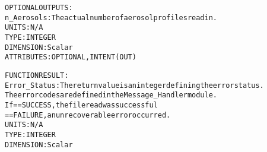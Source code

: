 \begin{alltt}
  OPTIONAL OUTPUTS:
        n_Aerosols:     The actual number of aerosol profiles read in.
                        UNITS:      N/A
                        TYPE:       INTEGER
                        DIMENSION:  Scalar
                        ATTRIBUTES: OPTIONAL, INTENT(OUT)
 
  FUNCTION RESULT:
        Error_Status:   The return value is an integer defining the error status.
                        The error codes are defined in the Message_Handler module.
                        If == SUCCESS, the file read was successful
                           == FAILURE, an unrecoverable error occurred.
                        UNITS:      N/A
                        TYPE:       INTEGER
                        DIMENSION:  Scalar
 
  \end{alltt}
